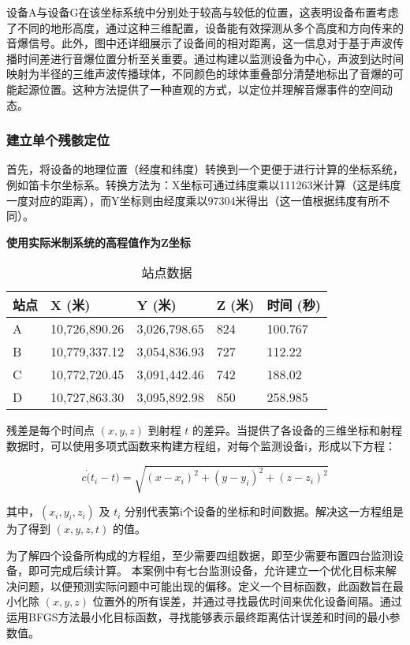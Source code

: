 \documentclass[withoutpreface,bwprint,12pt,a4paper]{cumcmthesis}
\begin{document}
设备A与设备G在该坐标系统中分别处于较高与较低的位置，这表明设备布置考虑了不同的地形高度，通过这种三维配置，设备能有效探测从多个高度和方向传来的音爆信号。此外，图中还详细展示了设备间的相对距离，这一信息对于基于声波传播时间差进行音爆位置分析至关重要。通过构建以监测设备为中心，声波到达时间映射为半径的三维声波传播球体，不同颜色的球体重叠部分清楚地标出了音爆的可能起源位置。这种方法提供了一种直观的方式，以定位并理解音爆事件的空间动态。



\subsubsection{建立单个残骸定位}
首先，将设备的地理位置（经度和纬度）转换到一个更便于进行计算的坐标系统，例如笛卡尔坐标系。转换方法为：X坐标可通过纬度乘以111263米计算（这是纬度一度对应的距离），而Y坐标则由经度乘以97304米得出（这一值根据纬度有所不同）。

\textbf{使用实际米制系统的高程值作为Z坐标}

\begin{table}[H]
    \centering
    \begin{tabular}{lllll} %
        \toprule
        站点 & X (米) & Y (米) & Z (米) & 时间 (秒) \\
        \midrule
        A & 10,726,890.26 & 3,026,798.65 & 824 & 100.767 \\
        B & 10,779,337.12 & 3,054,836.93 & 727 & 112.22 \\
        C & 10,772,720.45 & 3,091,442.46 & 742 & 188.02 \\
        D & 10,727,863.30 & 3,095,892.98 & 850 & 258.985 \\
        \bottomrule
    \end{tabular}
    \caption{站点数据}
    \label{tab:site_data}
\end{table}


残差是每个时间点 \( (x, y, z) \) 到射程 \( t \) 的差异。当提供了各设备的三维坐标和射程数据时，可以使用多项式函数来构建方程组，对每个监测设备i，形成以下方程：

\[ c \dot (t_i - t) = \sqrt{(x - x_i)^2 + (y - y_i)^2 + (z - z_i)^2} \]

其中，\( (x_i, y_i, z_i) \) 及 \( t_i \) 分别代表第i个设备的坐标和时间数据。解决这一方程组是为了得到 \( (x, y, z, t) \) 的值。

为了解四个设备所构成的方程组，至少需要四组数据，即至少需要布置四台监测设备，即可完成后续计算。
本案例中有七台监测设备，允许建立一个优化目标来解决问题，以便预测实际问题中可能出现的偏移。定义一个目标函数，此函数旨在最小化除 \( (x, y, z) \) 位置外的所有误差，并通过寻找最优时间来优化设备间隔。通过运用BFGS方法最小化目标函数，寻找能够表示最终距离估计误差和时间的最小参数值。
\end{document}
